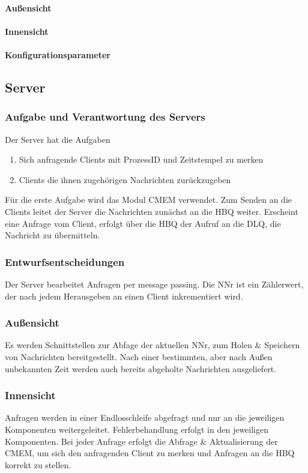 \documentclass{article}
\begin{document}
			\paragraph{Außensicht}
			\paragraph{Innensicht}
			\paragraph{Konfigurationsparameter}
			
	\subsection{Server}
	
		\subsubsection{Aufgabe und Verantwortung des Servers}
			Der Server hat die Aufgaben  
			\begin{enumerate}
    			\item{Sich anfragende Clients mit ProzessID und Zeitstempel zu merken}
    			\item{Clients die ihnen zugehörigen Nachrichten zurückzugeben}
			\end{enumerate}
			Für die erste Aufgabe wird das Modul CMEM verwendet. 
			Zum Senden an die Clients leitet der Server die Nachrichten zunächst an die HBQ weiter. 
			Erscheint eine Anfrage vom Client, erfolgt über die HBQ der Aufruf an die DLQ, 
			die Nachricht zu übermitteln.
		\subsubsection{Entwurfsentscheidungen}
			Der Server bearbeitet Anfragen per message passing. Die NNr ist ein Zählerwert,
			der nach jedem Herausgeben an einen Client inkrementiert wird.
		\subsubsection{Außensicht}
			Es werden Schnittstellen zur Abfage der aktuellen NNr, zum Holen & Speichern 
			von Nachrichten bereitgestellt. Nach einer bestimmten, aber nach Außen unbekannten 
			Zeit werden auch bereits abgeholte Nachrichten ausgeliefert.
		\subsubsection{Innensicht}
			Anfragen werden in einer Endlosschleife abgefragt und nur an die jeweiligen 
			Komponenten weitergeleitet. Fehlerbehandlung erfolgt in den jeweiligen Komponenten.
			Bei jeder Anfrage erfolgt die Abfrage & Aktualisierung der CMEM,
			um sich den anfragenden Client zu merken und Anfragen an die HBQ korrekt zu stellen.
			
\end{document}
